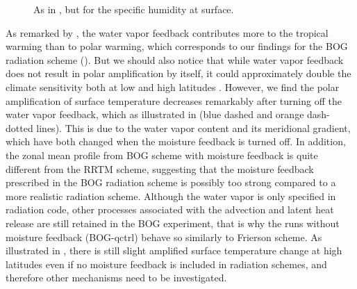 \begin{figure}[ht]
	\centering
	\caption[The zonal and annual mean specific humidity changes]{As in , but for the specific humidity at surface. }
	\label{fig:sfc_q_zonal}
\end{figure}

As remarked by \cite{Pithan2014}, the water vapor feedback contributes more to the tropical warming than to polar warming, which corresponds to our findings for the BOG radiation scheme (). But we should also notice that while water vapor feedback does not result in polar amplification by itself, it could approximately double the climate sensitivity both at low and high latitudes \citep{Langen2012}. However, we find the polar amplification of surface temperature decreases remarkably after turning off the water vapor feedback, which as illustrated in  (blue dashed and orange dash-dotted lines). This is due to the water vapor content and its meridional gradient, which have both changed when the moisture feedback is turned off. In addition, the zonal mean profile from BOG scheme with moisture feedback is quite different from the RRTM scheme, suggesting that the moisture feedback prescribed in the BOG radiation scheme is possibly too strong compared to a more realistic radiation scheme. Although the water vapor is only specified in radiation code, other processes associated with the advection and latent heat release are still retained in the BOG experiment, that is why the runs without moisture feedback (BOG-qctrl) behave so similarly to Frierson scheme. As illustrated in , there is still slight amplified surface temperature change at high latitudes even if no moisture feedback is included in radiation schemes, and therefore other mechanisms need to be investigated.


